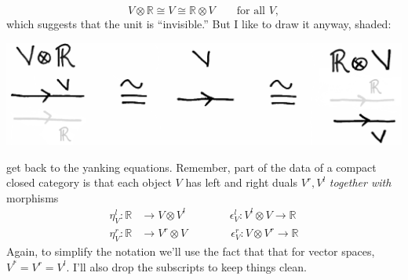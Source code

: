 \documentclass{tufte-handout-tai}
\theoremstyle{plain}
\theoremstyle{definition}
\theoremstyle{remark}
\begin{document}
\[V\otimes \mathbb{R}\cong V\cong \mathbb{R}\otimes V \qquad\text{for all $V$},\]
which suggests that the unit is ``invisible.'' But I like to draw it anyway, shaded:
\begin{center}
\includegraphics[width=!,totalheight=!,scale=0.5]{invisible.jpg}
\end{center}


 get back to the yanking equations. Remember, part of the data of a compact closed category is that each object $V$ has left and right duals $V^r, V^l$ \textit{together with} morphisms
\begin{align*}
\eta_V^l\colon \mathbb{R}&\to V\otimes V^l\qquad\qquad \epsilon_V^l\colon V^l\otimes V\to \mathbb{R}\\
\eta_V^r\colon \mathbb{R}&\to V^r\otimes V\qquad\qquad \epsilon_V^r\colon V\otimes V^r\to \mathbb{R}
\end{align*}
Again, to simplify the notation we'll use the fact that that for vector spaces, $V^*=V^r=V^l.$ I'll also drop the subscripts to keep things clean.
\end{document}
